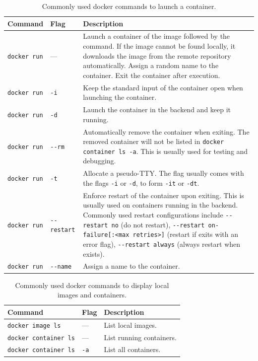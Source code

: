 \begin{table}
	\centering \caption{Commonly used docker commands to launch a container.}\label{ch:vac:tab:launchcontainer}
	\begin{tabularx}{\textwidth}{llX}
		\hline
		Command & Flag & Description \\ \hline
		\verb|docker run| & --- & Launch a container of the image followed by the command. If the image cannot be found locally, it downloads the image from the remote repository automatically. Assign a random name to the container. Exit the container after execution. \\ \hdashline
        \verb|docker run| & \verb|-i| & Keep the standard input of the container open when launching the container. \\ \hdashline
        \verb|docker run| & \verb|-d| & Launch the container in the backend and keep it running. \\ \hdashline
        \verb|docker run| & \verb|--rm| & Automatically remove the container when exiting. The removed container will not be listed in \verb|docker container ls -a|. This is usually used for testing and debugging. \\ \hdashline
        \verb|docker run| & \verb|-t| & Allocate a pseudo-TTY. The flag usually comes with the flags \verb|-i| or \verb|-d|, to form \verb|-it| or \verb|-dt|. \\ \hdashline
        \verb|docker run| & \verb|--restart| & Enforce restart of the container upon exiting. This is usually used on containers running in the backend. Commonly used restart configurations include \verb|--restart no| (do not restart), \verb|--restart on-failure[:<max retries>]| (restart if exits with an error flag), \verb|--restart always| (always restart when exists). \\ \hdashline
        \verb|docker run| & \verb|--name| & Assign a name to the container. \\
		\hline
	\end{tabularx}
\end{table}

\begin{table}
	\centering \caption{Commonly used docker commands to display local images and containers.}\label{ch:vac:tab:listcontainer}
	\begin{tabularx}{\textwidth}{llX}
		\hline
		Command & Flag & Description \\ \hline
        \verb|docker image ls| & --- & List local images. \\ \hdashline
        \verb|docker container ls| & --- & List running containers. \\ \hdashline
        \verb|docker container ls| & \verb|-a| & List all containers. \\
		\hline
	\end{tabularx}
\end{table}

